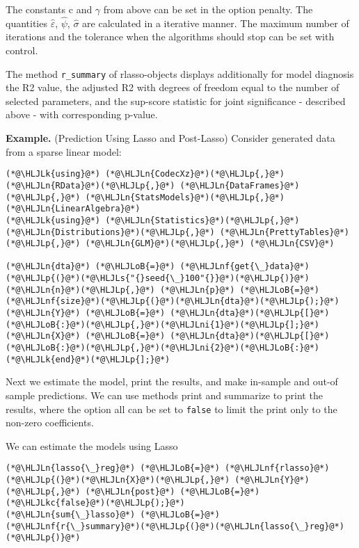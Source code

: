 \documentclass[12pt,a4paper]{article}
\newcommand{\HLJLk}[1]{\textcolor[RGB]{148,91,176}{\textbf{#1}}}
\newcommand{\HLJLkc}[1]{\textcolor[RGB]{59,151,46}{\textit{#1}}}
\newcommand{\HLJLn}[1]{#1}
\newcommand{\HLJLnf}[1]{\textcolor[RGB]{66,102,213}{#1}}
\newcommand{\HLJLs}[1]{\textcolor[RGB]{201,61,57}{#1}}
\newcommand{\HLJLni}[1]{\textcolor[RGB]{59,151,46}{#1}}
\newcommand{\HLJLoB}[1]{\textcolor[RGB]{102,102,102}{\textbf{#1}}}
\newcommand{\HLJLp}[1]{#1}
\begin{document}
The constants c and $\ensuremath{\gamma}$ from above can be set in the option penalty. The quantities $\hat\varepsilon$, $\hat\psi$, $\hat\sigma$ are calculated in a iterative manner. The maximum number of iterations and the tolerance when the algorithms should stop can be set with control.

The method \texttt{r\_summary} of rlasso-objects displays additionally for model diagnosis the R2 value, the adjusted R2 with degrees of freedom equal to the number of selected parameters, and the sup-score statistic for joint significance - described above - with corresponding p-value.

\textbf{Example.} (Prediction Using Lasso and Post-Lasso) Consider generated data from a sparse linear model:


\begin{lstlisting}
(*@\HLJLk{using}@*) (*@\HLJLn{CodecXz}@*)(*@\HLJLp{,}@*) (*@\HLJLn{RData}@*)(*@\HLJLp{,}@*) (*@\HLJLn{DataFrames}@*)(*@\HLJLp{,}@*) (*@\HLJLn{StatsModels}@*)(*@\HLJLp{,}@*) (*@\HLJLn{LinearAlgebra}@*)
(*@\HLJLk{using}@*) (*@\HLJLn{Statistics}@*)(*@\HLJLp{,}@*) (*@\HLJLn{Distributions}@*)(*@\HLJLp{,}@*) (*@\HLJLn{PrettyTables}@*)(*@\HLJLp{,}@*) (*@\HLJLn{GLM}@*)(*@\HLJLp{,}@*) (*@\HLJLn{CSV}@*)

(*@\HLJLn{dta}@*) (*@\HLJLoB{=}@*) (*@\HLJLnf{get{\_}data}@*)(*@\HLJLp{(}@*)(*@\HLJLs{"{}seed{\_}100"{}}@*)(*@\HLJLp{)}@*)
(*@\HLJLn{n}@*)(*@\HLJLp{,}@*) (*@\HLJLn{p}@*) (*@\HLJLoB{=}@*) (*@\HLJLnf{size}@*)(*@\HLJLp{(}@*)(*@\HLJLn{dta}@*)(*@\HLJLp{);}@*)
(*@\HLJLn{Y}@*) (*@\HLJLoB{=}@*) (*@\HLJLn{dta}@*)(*@\HLJLp{[}@*)(*@\HLJLoB{:}@*)(*@\HLJLp{,}@*)(*@\HLJLni{1}@*)(*@\HLJLp{];}@*)
(*@\HLJLn{X}@*) (*@\HLJLoB{=}@*) (*@\HLJLn{dta}@*)(*@\HLJLp{[}@*)(*@\HLJLoB{:}@*)(*@\HLJLp{,}@*)(*@\HLJLni{2}@*)(*@\HLJLoB{:}@*)(*@\HLJLk{end}@*)(*@\HLJLp{];}@*)
\end{lstlisting}


Next we estimate the model, print the results, and make in-sample and out-of sample predictions. We can use methods print and summarize to print the results, where the option all can be set to \texttt{false} to limit the print only to the non-zero coefficients.

We can estimate the models using Lasso


\begin{lstlisting}
(*@\HLJLn{lasso{\_}reg}@*) (*@\HLJLoB{=}@*) (*@\HLJLnf{rlasso}@*)(*@\HLJLp{(}@*)(*@\HLJLn{X}@*)(*@\HLJLp{,}@*) (*@\HLJLn{Y}@*)(*@\HLJLp{,}@*) (*@\HLJLn{post}@*) (*@\HLJLoB{=}@*) (*@\HLJLkc{false}@*)(*@\HLJLp{);}@*)
(*@\HLJLn{sum{\_}lasso}@*) (*@\HLJLoB{=}@*) (*@\HLJLnf{r{\_}summary}@*)(*@\HLJLp{(}@*)(*@\HLJLn{lasso{\_}reg}@*)(*@\HLJLp{)}@*)
\end{lstlisting}
\end{document}
